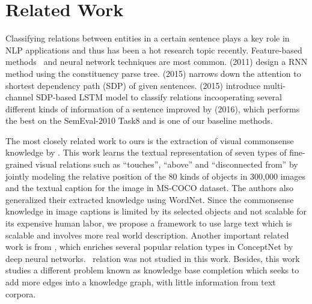 \section{Related Work}
Classifying relations between entities in a certain sentence plays a key role in NLP applications and thus has been a hot research topic recently.
Feature-based methods~\cite{sem} and neural network techniques are most common. 
\citeauthor{socher2011semi} (2011) design a RNN method using the constituency parse tree. \citeauthor{ebrahimi2015chain} (2015) narrows down the attention to shortest dependency path (SDP) of given sentences. 
\citeauthor{xu2015classifying} (2015) introduce multi-channel SDP-based LSTM model to classify relations incooperating several different kinds of information of a sentence improved by \citeauthor{xu2016improved} (2016), which performs the best on the SemEval-2010 Task8 and is one of our baseline methods.

The most closely related work to ours is the extraction of
visual commonsense knowledge by \citeauthor{yatskar2016stating}. 
This work learns the textual representation of seven types of fine-grained 
visual relations such as ``touches'', ``above'' and ``disconnected from'' 
by jointly modeling the relative position of the 80 kinds of objects in 300,000 images
and the textual caption for the image in MS-COCO dataset\cite{lin2014microsoft}. 
The authors also generalized their extracted knowledge using WordNet. 
Since the commonsense knowledge in image captions is limited by its selected objects and not scalable for its expensive human labor, we propose a framework to use large text which is scalable and involves more real world description. 
Another important related work is from \citeauthor{li2016commonsense}, which enriches
several popular relation types in ConceptNet by deep neural networks.
\lnear~relation was not studied in this work. Besides, this work studies
a different problem known as knowledge base completion which seeks to
add more edges into a knowledge graph, with little information from
text corpora. 
